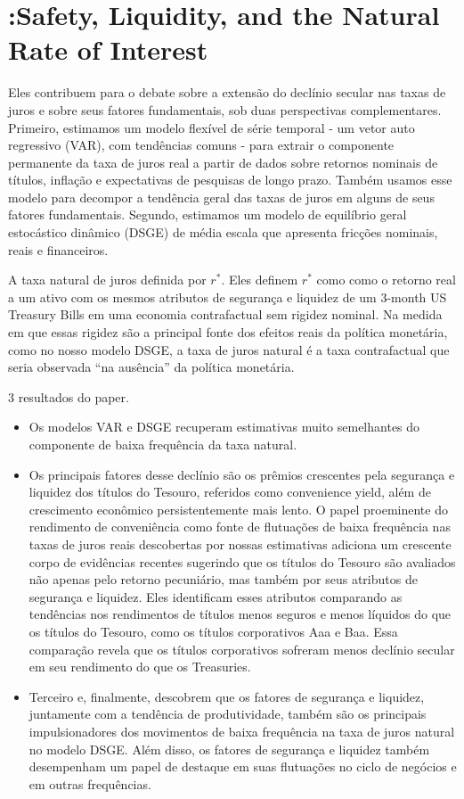\section{\citet{DelNegro:2017}:Safety, Liquidity,
and the Natural Rate of Interest }

Eles contribuem para o debate sobre a extensão do declínio secular nas taxas de juros e sobre seus fatores fundamentais, sob duas perspectivas complementares. Primeiro, estimamos um modelo flexível de série temporal - um vetor auto regressivo (VAR), com tendências comuns - para extrair o componente permanente da taxa de juros real a partir de dados sobre retornos nominais de títulos, inflação e expectativas de pesquisas de longo prazo. Também usamos esse modelo para decompor a tendência geral das taxas de juros em alguns de seus fatores fundamentais. Segundo, estimamos um modelo de equilíbrio geral estocástico dinâmico (DSGE) de média escala que apresenta fricções nominais, reais e financeiros.

A taxa natural de juros definida por $r^{*}$. Eles definem $r^{*}$ como como o retorno real a um ativo com os mesmos atributos de segurança e liquidez de um 3-month US Treasury Bills em uma economia contrafactual sem rigidez nominal. Na medida em que essas rigidez são a principal fonte dos efeitos reais da política monetária, como no nosso modelo DSGE, a taxa de juros natural é a taxa contrafactual que seria observada “na ausência” da política monetária.

3 resultados do paper.
\begin{itemize}
    \item Os modelos VAR e DSGE recuperam estimativas muito semelhantes do componente de baixa frequência da taxa natural.
    
    \item Os principais fatores desse declínio são os prêmios crescentes pela segurança e liquidez dos títulos do Tesouro, referidos como convenience yield, além de crescimento econômico persistentemente mais lento. O papel proeminente do rendimento de conveniência como fonte de flutuações de baixa frequência nas taxas de juros reais descobertas por nossas estimativas adiciona um crescente corpo de evidências recentes sugerindo que os títulos do Tesouro são avaliados não apenas pelo retorno pecuniário, mas também por seus atributos de segurança e liquidez. Eles identificam esses atributos comparando as tendências nos rendimentos de títulos menos seguros e menos líquidos do que os títulos do Tesouro, como os títulos corporativos Aaa e Baa. Essa comparação revela que os títulos corporativos sofreram menos declínio secular em seu rendimento do que os Treasuries.
    
    \item Terceiro e, finalmente, descobrem que os fatores de segurança e liquidez, juntamente com a tendência de produtividade, também são os principais impulsionadores dos movimentos de baixa frequência na taxa de juros natural no modelo DSGE. Além disso, os fatores de segurança e liquidez também desempenham um papel de destaque em suas flutuações no ciclo de negócios e em outras frequências.
\end{itemize}

